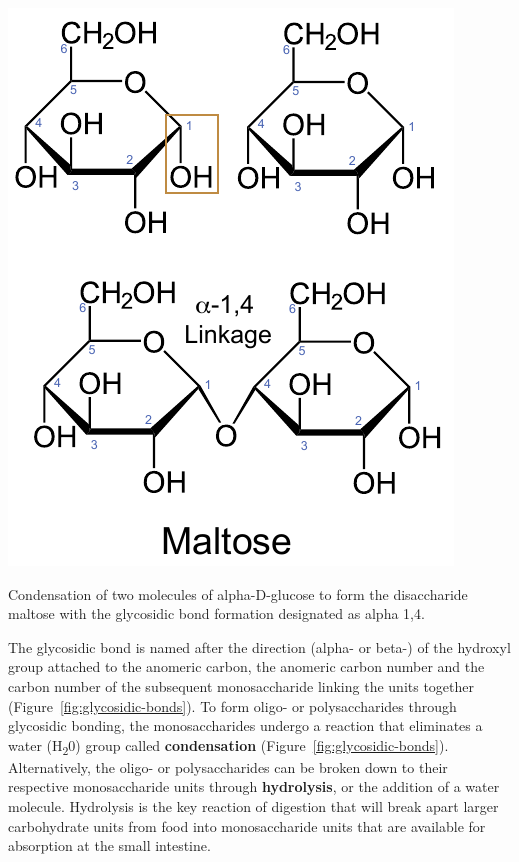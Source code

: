 \documentclass{tufte-handout}
\begin{document}
\begin{marginfigure}
\includegraphics{figures/glycosidic-bonds.pdf}
\caption{Condensation of two molecules of alpha-D-glucose to form the disaccharide maltose with the glycosidic bond formation designated as alpha 1,4.}\label{fig:glycosidic-bonds}
\end{marginfigure}


 The glycosidic bond is named after the direction (alpha- or beta-) of the hydroxyl group attached to the anomeric carbon, the anomeric carbon number and the carbon number of the subsequent monosaccharide linking the units together (Figure~\ref{fig:glycosidic-bonds}). To form oligo- or polysaccharides through glycosidic bonding, the monosaccharides undergo a reaction that eliminates a water (H\textsubscript{2}0) group called \textbf{condensation} (Figure~\ref{fig:glycosidic-bonds}). Alternatively, the oligo- or polysaccharides can be broken down to their respective monosaccharide units through \textbf{hydrolysis}, or the addition of a water molecule. Hydrolysis is the key reaction of digestion that will break apart larger carbohydrate units from food into monosaccharide units that are available for absorption at the small intestine.
\end{document}
